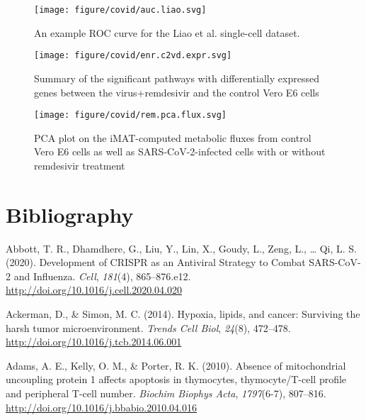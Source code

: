 \documentclass[12pt,twoside,openany,\mydriver]{thesis}  %
\begin{document}
\begin{figure}
\texttt{[image: figure/covid/auc.liao.svg]} \caption{An example ROC curve for the Liao et al. single-cell dataset.}\label{fig:covid-mta-roc-liao}
\end{figure}
\begin{figure}
\texttt{[image: figure/covid/enr.c2vd.expr.svg]} \caption{Summary of the significant pathways with differentially expressed genes between the virus+remdesivir and the control Vero E6 cells}\label{fig:covid-rem-expr-pathway}
\end{figure}
\begin{figure}
\texttt{[image: figure/covid/rem.pca.flux.svg]} \caption{PCA plot on the iMAT-computed metabolic fluxes from control Vero E6 cells as well as SARS-CoV-2-infected cells with or without remdesivir treatment}\label{fig:covid-rem-flux-pca}
\end{figure}
\hypertarget{bibliography}{%
\chapter*{Bibliography}\label{bibliography}}


\noindent

\setlength{\parindent}{-0.20in}
\setlength{\leftskip}{0.20in}
\setlength{\parskip}{8pt}

\hypertarget{refs}{}
\leavevmode\hypertarget{ref-abbott_development_2020}{}%
Abbott, T. R., Dhamdhere, G., Liu, Y., Lin, X., Goudy, L., Zeng, L., \ldots{} Qi, L. S. (2020). Development of CRISPR as an Antiviral Strategy to Combat SARS-CoV-2 and Influenza. \emph{Cell}, \emph{181}(4), 865--876.e12. \url{http://doi.org/10.1016/j.cell.2020.04.020}

\leavevmode\hypertarget{ref-ackerman_hypoxia_2014}{}%
Ackerman, D., \& Simon, M. C. (2014). Hypoxia, lipids, and cancer: Surviving the harsh tumor microenvironment. \emph{Trends Cell Biol}, \emph{24}(8), 472--478. \url{http://doi.org/10.1016/j.tcb.2014.06.001}

\leavevmode\hypertarget{ref-adams_absence_2010}{}%
Adams, A. E., Kelly, O. M., \& Porter, R. K. (2010). Absence of mitochondrial uncoupling protein 1 affects apoptosis in thymocytes, thymocyte/T-cell profile and peripheral T-cell number. \emph{Biochim Biophys Acta}, \emph{1797}(6-7), 807--816. \url{http://doi.org/10.1016/j.bbabio.2010.04.016}
\end{document}
